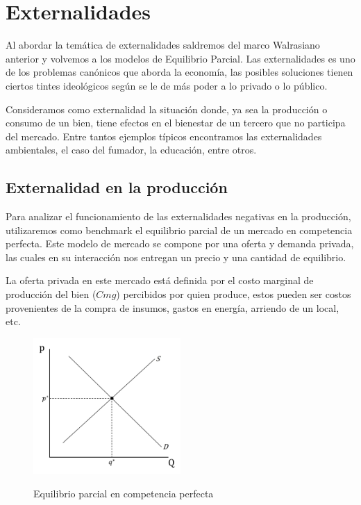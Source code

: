 \section{Externalidades}

Al abordar la temática de externalidades saldremos del marco Walrasiano anterior y volvemos a los modelos de Equilibrio Parcial. Las externalidades es uno de los problemas canónicos que aborda la economía, las posibles soluciones tienen ciertos tintes ideológicos según se le de más poder a lo privado o lo público.

Consideramos como externalidad la situación donde, ya sea la producción o consumo de un bien, tiene efectos en el bienestar de un tercero que no participa del mercado. Entre tantos ejemplos típicos encontramos las externalidades ambientales, el caso del fumador, la educación, entre otros.

\subsection{Externalidad en la producción}

Para analizar el funcionamiento de las externalidades negativas en la producción, utilizaremos como benchmark el equilibrio parcial de un mercado en competencia perfecta. Este modelo de mercado se compone por una oferta y demanda privada, las cuales en su interacción nos entregan un precio y una cantidad de equilibrio.

La oferta privada en este mercado está definida por el costo marginal de producción del bien ($Cmg$) percibidos por quien produce, estos pueden ser costos provenientes de la compra de insumos, gastos en energía, arriendo de un local, etc. 

\begin{figure}[htbp]
    \centering
    \caption{Equilibrio parcial en competencia perfecta}
    \includegraphics[width=0.5\textwidth]{Figuras/Eq Parcial EXT.jpg}
    \label{fig:Eq parcial}
\end{figure}

